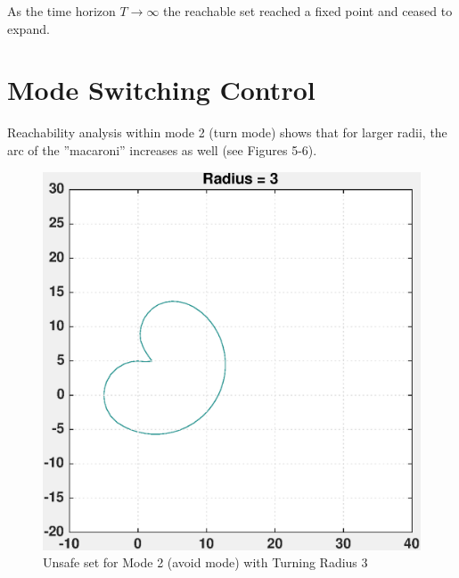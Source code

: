 \documentclass[a4paper]{article}
\begin{document}
As the time horizon $T \rightarrow \infty$ the reachable set reached a fixed point and ceased to expand.

\section{Mode Switching Control}
Reachability analysis within mode 2 (turn mode) shows that for larger radii, the arc of the ''macaroni'' increases as well (see Figures 5-6).
\begin{figure}[!ht]
  \centering
  \begin{minipage}[b]{0.4\textwidth}
    \includegraphics[width=1.0\textwidth]{HyAvoid3.eps}
    \caption{Unsafe set for Mode 2 (avoid mode) with Turning Radius 3}
  \end{minipage}
  \hfill
  \begin{minipage}[b]{0.4\textwidth}

\end{minipage}
\end{figure}
\end{document}
